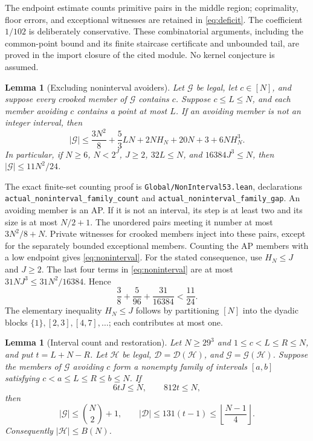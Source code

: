 \documentclass[11pt,a4paper]{article}
\newtheorem{lemma}[theorem]{Lemma}
\theoremstyle{definition}\newtheorem{definition}[theorem]{Definition}
\newcommand{\G}{\mathcal G}
\newcommand{\D}{\mathcal D}
\newcommand{\Hh}{\mathcal H}
\newcommand{\code}[1]{{\small\nolinkurl{#1}}}
\begin{document}
The endpoint estimate counts primitive pairs in the middle region;
coprimality, floor errors, and exceptional witnesses are retained in
\eqref{eq:deficit}. The coefficient $1/102$ is deliberately conservative.
These combinatorial arguments, including the common-point bound and its
finite staircase certificate and unbounded tail, are proved in the import
closure of the cited module. No kernel conjecture is assumed.

\begin{lemma}[Excluding noninterval avoiders]\label{lem:noninterval}
Let $\G$ be legal, let $c\in[N]$, and suppose every crooked member of
$\G$ contains $c$. Suppose $c\le L\le N$, and each member avoiding $c$
contains a point at most $L$. If an avoiding member is not an integer
interval, then
\begin{equation}\label{eq:noninterval}
 |\G|\le\frac{3N^2}{8}+\frac53LN+2NH_N+20N+3+6NH_N^3.
\end{equation}
In particular, if $N\ge6$, $N<2^J$, $J\ge2$, $32L\le N$, and
$16384J^3\le N$, then $|\G|\le11N^2/24$.
\end{lemma}

The exact finite-set counting proof is
\code{Global/NonInterval53.lean}, declarations
\code{actual_noninterval_family_count} and
\code{actual_noninterval_family_gap}.
An avoiding member is an AP. If it is not an interval, its step is at
least two and its size is at most $N/2+1$. The unordered pairs meeting
it number at most $3N^2/8+N$. Private witnesses for crooked members
inject into these pairs, except for the separately bounded exceptional
members. Counting the AP members with a low endpoint gives
\eqref{eq:noninterval}. For the stated consequence, use $H_N\le J$
and $J\ge2$. The last four terms in \eqref{eq:noninterval} are at most
$31NJ^3\le31N^2/16384$. Hence
\[
 \frac38+\frac5{96}+\frac{31}{16384}<\frac{11}{24}.
\]
The elementary inequality $H_N\le J$ follows by partitioning $[N]$
into the dyadic blocks $\{1\},[2,3],[4,7],\ldots$; each contributes
at most one.

\begin{lemma}[Interval count and restoration]\label{lem:restore}
Let $N\ge29^3$ and $1\le c<L\le R\le N$, and put $t=L+N-R$.
Let $\Hh$ be legal, $\D=\D(\Hh)$, and $\G=\G(\Hh)$.
Suppose the members of $\G$ avoiding $c$ form a nonempty family of
intervals $[a,b]$ satisfying $c<a\le L\le R\le b\le N$.
If
\begin{equation}\label{eq:payments}
 6tJ\le N,\qquad812t\le N,
\end{equation}
then
\begin{equation}\label{eq:restore-counts}
 |\G|\le\binom N2+1,
 \qquad |\D|\le131(t-1)\le\left\lfloor\frac{N-1}{4}\right\rfloor.
\end{equation}
Consequently $|\Hh|\le B(N)$.
\end{lemma}
\end{document}
